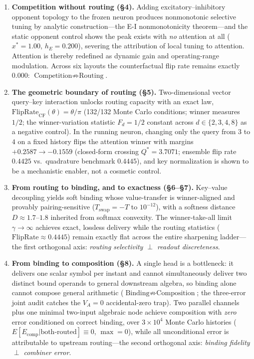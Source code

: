 \begin{enumerate}
\item \textbf{Competition without routing (§4).} Adding
excitatory--inhibitory opponent topology to the frozen neuron produces
nonmonotonic selective tuning by analytic construction---the E-I
nonmonotonicity theorem---and the static opponent control shows the peak
exists with \emph{no} attention at all ($x^*=1.00$, $h_E=0.200$), severing
the attribution of local tuning to attention. Attention is thereby redefined
as dynamic gain and operating-range modulation. Across six layouts the
counterfactual flip rate remains exactly $0.000$:
$\text{Competition}\not\Rightarrow\text{Routing}$.
\item \textbf{The geometric boundary of routing (§5).} Two-dimensional
vector query--key interaction unlocks routing capacity with an exact law,
$\mathrm{FlipRate}_{\mathrm{CF}}(\theta)=\theta/\pi$ (132/132 Monte Carlo
conditions; winner measures $1/2$; the winner-variation statistic $F_d=1/2$
constant across $d\in\{2,3,4,8\}$ as a negative control). In the running
neuron, changing only the query from $3$ to $4$ on a fixed history flips the
attention winner with margins $+0.2587\to-0.1559$ (closed-form crossing
$Q^*=3.7071$; ensemble flip rate $0.4425$ vs.\ quadrature benchmark
$0.4445$), and key normalization is shown to be a mechanistic enabler, not a
cosmetic control.
\item \textbf{From routing to binding, and to exactness (§6--§7).}
Key--value decoupling yields soft binding whose value-transfer is
winner-aligned and provably pairing-sensitive ($T_{\mathrm{swap}}=-T$ to
$10^{-12}$), with a softness distance $D\approx1.7$--$1.8$ inherited from
softmax convexity. The winner-take-all limit $\gamma\to\infty$ achieves
exact, lossless delivery while the routing statistics
($\mathrm{FlipRate}\approx0.4445$) remain exactly flat across the entire
sharpening ladder---the first orthogonal axis:
\emph{routing selectivity $\perp$ readout discreteness}.
\item \textbf{From binding to composition (§8).} A single head is a
bottleneck: it delivers one scalar symbol per instant and cannot simultaneously
deliver two distinct bound operands to general downstream algebra, so binding
alone cannot compose general arithmetic ($\text{Binding}\not\Rightarrow\text{Composition}$;
the three-error joint audit catches the $V_A=0$ accidental-zero trap). Two parallel channels
plus one minimal two-input algebraic node achieve composition with
\emph{zero} error conditioned on correct binding, over $3\times10^4$
Monte Carlo histories ($E[E_{\mathrm{comp}}|\text{both-routed}]\equiv0$,
$\max=0$), while all unconditional error is attributable to upstream
routing---the second orthogonal axis:
\emph{binding fidelity $\perp$ combiner error}.
\end{enumerate}

